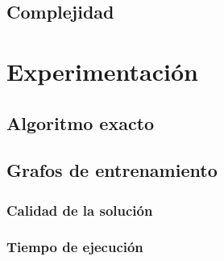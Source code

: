 \documentclass[a4paper, 10pt, twoside]{article}
\begin{document}
\subsection{Complejidad}



\newpage


\section{Experimentación}


\subsection{Algoritmo exacto}


\begin{figure}[H]
	
\end{figure}


\subsection{Grafos de entrenamiento}


\subsubsection{Calidad de la solución}

\begin{figure}[H]
	
\end{figure}

\begin{figure}[H]
	
\end{figure}

\begin{figure}[H]
	
\end{figure}


\subsubsection{Tiempo de ejecución}

\begin{figure}[H]
	
\end{figure}
\end{document}
